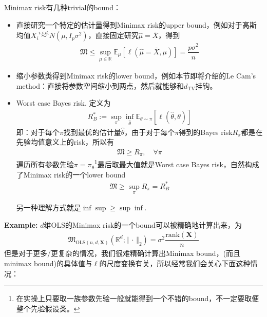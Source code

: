 \documentclass[11pt,a4paper]{ctexart}
\numberwithin{equation}{section}%
\begin{document}
Minimax risk有几种trivial的bound：
\begin{itemize}[topsep=2pt,itemsep=0pt]
    \item 直接研究一个特定的估计量得到Minimax risk的upper bound，例如对于高斯均值$ X_i\mathop{ \sim  }\limits^{i.i.d.}N(\mu ,I_p\sigma ^2)  $，直接固定研究$ \hat{\mu }=\bar{X} $，得到
    \begin{align*}
        \mathfrak{M}\leq \mathop{ \sup  }\limits_{\mu \in \mathbb{R}} \mathbb{E}_\mu \left[ \ell(\hat{\mu }=\bar{X},\mu ) \right] = \dfrac{ p\sigma ^2 }{ n }
    \end{align*}
    \item 缩小参数类得到Minimax risk的lower bound，例如本节即将介绍的Le Cam's method：直接将参数空间缩小到两点，然后就能够和$ d_{\mathrm{ TV } } $挂钩。
    \item Worst case Bayes risk. 定义为
    \begin{align*}
        R_B^*:= \mathop{ \sup  }\limits_{\pi} \mathop{ \inf  }\limits_{\hat{\theta }} \mathbb{E}_{\theta \sim \pi}\left[ \ell(\hat{\theta},\theta) \right] 
    \end{align*}
    即：对于每个$ \pi $找到最优的估计量$ \hat{\theta } $，由于对于每个$ \pi $得到的Bayes risk$ R_\pi $都是在先验均值意义上的risk，所以有
    \begin{align*}
        \mathfrak{M}\geq R_\pi,\quad \forall \pi 
    \end{align*}
    遍历所有参数先验$ \pi=\pi_\theta  $\footnote{在实操上只要取一族参数先验一般就能得到一个不错的bound，不一定要取便整个先验假设类。}最后取最大值就是Worst case Bayes risk，自然构成了Minimax risk的一个lower bound
    \begin{align*}
        \mathfrak{M}\geq \mathop{ \sup  }\limits_{\pi}R_\pi = R_B^* 
    \end{align*}
    
    

    另一种理解方式就是$ \inf\sup \geq \sup\inf $.
\end{itemize}



\textbf{Example:} $ d $维OLS的Minimax risk的一个bound可以被精确地计算出来，为
\begin{align*}
    \mathfrak{M}_{\mathrm{ OLS }(n,d,\mathbf{X})} (\mathbb{R}^d; \left\Vert \, \cdot \,  \right\Vert _2) = \sigma ^2 \dfrac{ \mathrm{ rank }(\mathbf{X}) }{ n } 
\end{align*}
但是对于更多/更复杂的情况，我们很难精确计算出Minimax bound，(而且minimax bound)的具体值与$ \ell $的尺度变换有关，所以经常我们会关心下面这种情况：
\end{document}
